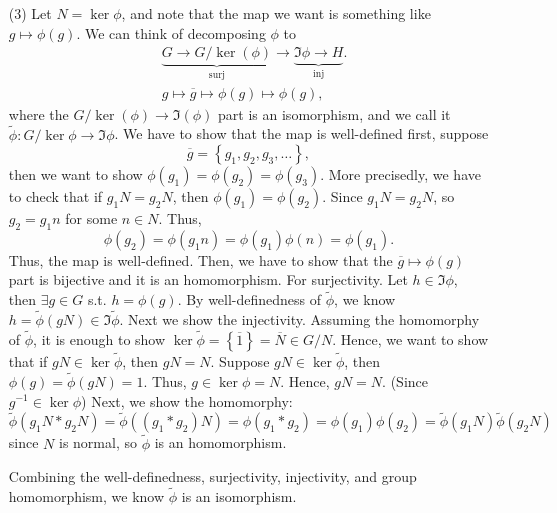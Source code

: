 \begin{explanation}
\begin{itemize}
        \item [(3)] Let \(N = \ker \phi \), and note that the map we want is something like \(g \mapsto \phi(g)\). We can think of decomposing \(\phi \) to  
        \begin{align*}
            &\underbrace{G \to G / \ker (\phi )}_{\text{surj}} \to \underbrace{\Im \phi \to H}_{\text{inj}}. \\
            &g \mapsto \overline{g} \mapsto \phi (g) \mapsto \phi (g), 
        \end{align*}
        where the \(G / \ker(\phi ) \to \Im (\phi )\) part is an isomorphism, and we call it \(\widetilde{\phi }: G / \ker \phi \to \Im \phi  \). We have to show that the map is well-defined first, suppose 
        \[
            \overline{g} = \left\{ g_1, g_2, g_3, \dots  \right\},  
        \]then  we want to show \(\phi (g_1) = \phi (g_2) = \phi (g_3)\). More precisedly, we have to check that if \(g_1 N = g_2 N\), then \(\phi (g_1) = \phi (g_2)\). Since \(g_1 N = g_2 N\), so \(g_2 = g_1 n\) for some \(n \in N\). Thus,
        \[
            \phi (g_2) = \phi (g_1 n) = \phi (g_1) \phi (n) = \phi (g_1).
        \] Thus, the map is well-defined. Then, we have to show that the \(\overline{g} \mapsto \phi (g) \) part is bijective and it is an homomorphism. For surjectivity. Let \(h \in \Im \phi \), then \(\exists g \in G\) s.t. \(h = \phi (g)\). By well-definedness of \(\widetilde{\phi } \), we know \(h = \widetilde{\phi }(gN) \in \Im \widetilde{\phi }  \). Next we show the injectivity. Assuming the homomorphy of \(\widetilde{\phi } \), it is enough to show \(\ker \widetilde{\phi } = \left\{ \overline{1}  \right\} = \overline{N} \in G / N  \). Hence, we want to show that if \(gN \in \ker \widetilde{\phi } \), then \(gN=N\). Suppose \(gN \in \ker \widetilde{\phi } \), then \(\phi (g) = \widetilde{\phi }(gN) = 1 \). Thus, \(g \in \ker \phi = N\). Hence, \(gN = N\). (Since \(g^{-1} \in \ker \phi  \)) Next, we show the homomorphy: 
        \[
            \widetilde{\phi }(g_1 N * g_2 N) = \widetilde{\phi }((g_1 * g_2)N)  = \phi (g_1 * g_2) = \phi (g_1) \phi (g_2) = \widetilde{\phi }(g_1 N) \widetilde{\phi }(g_2 N)    
        \] since \(N\) is normal,  so \(\widetilde{\phi } \) is an homomorphism. 
        
        Combining the well-definedness, surjectivity, injectivity, and group homomorphism, we know \(\widetilde{\phi } \) is an isomorphism.
    \end{itemize}
\end{explanation}

